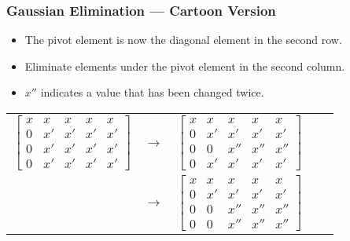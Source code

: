 \documentclass[10pt]{beamer}
\begin{document}
\begin{frame}
\frametitle{Gaussian Elimination --- Cartoon Version}
\begin{itemize}
    \item The pivot element is now the diagonal element in the second row.
    \item Eliminate elements under the pivot element in the second column.
    \item $x''$ indicates a value that has been changed twice.
\end{itemize}
\begin{center}
	\renewcommand{\arraystretch}{1.3}
	\footnotesize
	\begin{tabular}{ccccc}
		$\begin{bmatrix} x &   x        & x & x & x    \\
						 0 & \boxed{x'} & x' & x' & x' \\
						 0 &   x'       & x' & x' & x' \\
						 0 &   x'       & x' & x' & x' \end{bmatrix}$
		& $\longrightarrow$ &
		$\begin{bmatrix} x &   x        & x   & x   & x   \\
						 0 & \boxed{x'} & x'  & x'  & x'  \\
						 0 &   0        & x'' & x'' & x'' \\
						 0 &   x'       & x'  & x'  & x'\end{bmatrix}$ \\[55pt]
		& $\longrightarrow$ &
		$\begin{bmatrix} x &   x        & x   & x   & x   \\
						 0 & \boxed{x'} & x'  & x'  & x'  \\
						 0 &   0        & x'' & x'' & x'' \\
						 0 &   0        & x'' & x'' & x'' \end{bmatrix}$
	\end{tabular}
\end{center}

\end{frame}
\end{document}
